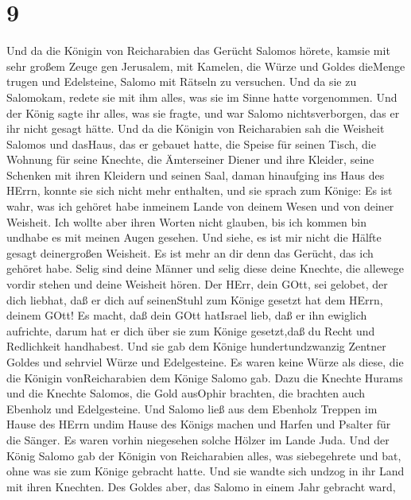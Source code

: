 \hypertarget{section-8}{%
\section{9}\label{section-8}}

 Und da die Königin von Reicharabien das Gerücht Salomos
hörete, kamsie mit sehr großem Zeuge gen Jerusalem, mit Kamelen, die
Würze und Goldes dieMenge trugen und Edelsteine, Salomo mit Rätseln zu
versuchen. Und da sie zu Salomokam, redete sie mit ihm alles, was sie im
Sinne hatte vorgenommen.  Und der König sagte ihr alles, was
sie fragte, und war Salomo nichtsverborgen, das er ihr nicht gesagt
hätte.  Und da die Königin von Reicharabien sah die Weisheit
Salomos und dasHaus, das er gebauet hatte,  die Speise für
seinen Tisch, die Wohnung für seine Knechte, die Ämterseiner Diener und
ihre Kleider, seine Schenken mit ihren Kleidern und seinen Saal, daman
hinaufging ins Haus des HErrn, konnte sie sich nicht mehr enthalten,
 und sie sprach zum Könige: Es ist wahr, was ich gehöret
habe inmeinem Lande von deinem Wesen und von deiner Weisheit.
 Ich wollte aber ihren Worten nicht glauben, bis ich kommen
bin undhabe es mit meinen Augen gesehen. Und siehe, es ist mir nicht die
Hälfte gesagt deinergroßen Weisheit. Es ist mehr an dir denn das
Gerücht, das ich gehöret habe.  Selig sind deine Männer und
selig diese deine Knechte, die allewege vordir stehen und deine Weisheit
hören.  Der HErr, dein GOtt, sei gelobet, der dich liebhat,
daß er dich auf seinenStuhl zum Könige gesetzt hat dem HErrn, deinem
GOtt! Es macht, daß dein GOtt hatIsrael lieb, daß er ihn ewiglich
aufrichte, darum hat er dich über sie zum Könige gesetzt,daß du Recht
und Redlichkeit handhabest.  Und sie gab dem Könige
hundertundzwanzig Zentner Goldes und sehrviel Würze und Edelgesteine. Es
waren keine Würze als diese, die die Königin vonReicharabien dem Könige
Salomo gab.  Dazu die Knechte Hurams und die Knechte
Salomos, die Gold ausOphir brachten, die brachten auch Ebenholz und
Edelgesteine.  Und Salomo ließ aus dem Ebenholz Treppen im
Hause des HErrn undim Hause des Königs machen und Harfen und Psalter für
die Sänger. Es waren vorhin niegesehen solche Hölzer im Lande Juda.
 Und der König Salomo gab der Königin von Reicharabien
alles, was siebegehrete und bat, ohne was sie zum Könige gebracht hatte.
Und sie wandte sich undzog in ihr Land mit ihren Knechten. 
Des Goldes aber, das Salomo in einem Jahr gebracht ward,
